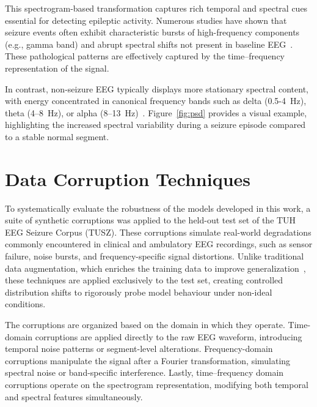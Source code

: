 This spectrogram-based transformation captures rich temporal and spectral cues essential for detecting epileptic activity. Numerous studies have shown that seizure events often exhibit characteristic bursts of high-frequency components (e.g., gamma band) and abrupt spectral shifts not present in baseline EEG~\cite{niedermeyer2005}. These pathological patterns are effectively captured by the time–frequency representation of the signal.

In contrast, non-seizure EEG typically displays more stationary spectral content, with energy concentrated in canonical frequency bands such as delta (0.5-4~Hz), theta (4–8~Hz), or alpha (8–13~Hz)~\cite{niedermeyer2005}. Figure~\ref{fig:psd} provides a visual example, highlighting the increased spectral variability during a seizure episode compared to a stable normal segment.
\clearpage
\section{Data Corruption Techniques}
To systematically evaluate the robustness of the models developed in this work, a suite of synthetic corruptions was applied to the held-out test set of the TUH EEG Seizure Corpus (TUSZ). These corruptions simulate real-world degradations commonly encountered in clinical and ambulatory EEG recordings, such as sensor failure, noise bursts, and frequency-specific signal distortions. Unlike traditional data augmentation, which enriches the training data to improve generalization~\cite{spectral_aug}, these techniques are applied exclusively to the test set, creating controlled distribution shifts to rigorously probe model behaviour under non-ideal conditions.

The corruptions are organized based on the domain in which they operate. Time-domain corruptions are applied directly to the raw EEG waveform, introducing temporal noise patterns or segment-level alterations. Frequency-domain corruptions manipulate the signal after a Fourier transformation, simulating spectral noise or band-specific interference. Lastly, time–frequency domain corruptions operate on the spectrogram representation, modifying both temporal and spectral features simultaneously.

